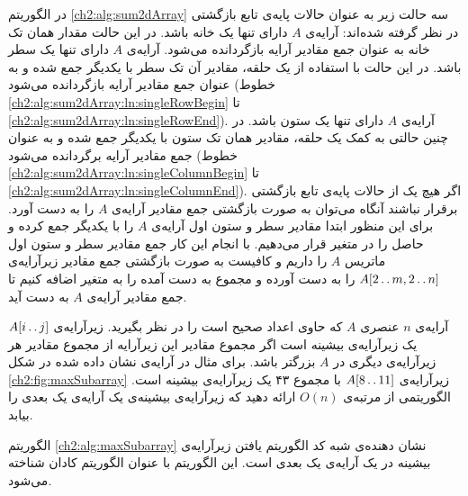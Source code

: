 در الگوریتم {\eqref{ch2:alg:sum2dArray}} سه حالت زیر به عنوان حالات پایه‌ی تابع بازگشتی در نظر گرفته شده‌اند:
 آرایه‌ی {$A$} دارای تنها یک خانه باشد. در این حالت مقدار همان تک خانه به عنوان جمع مقادیر آرایه بازگردانده می‌شود.
 آرایه‌ی {$A$} دارای تنها یک سطر باشد. در این حالت با استفاده از یک حلقه، مقادیر آن تک سطر با یکدیگر جمع شده و به عنوان جمع مقادیر آرایه بازگردانده می‌شود (خطوط {\ref{ch2:alg:sum2dArray:ln:singleRowBegin}} تا {\ref{ch2:alg:sum2dArray:ln:singleRowEnd}}).
 آرایه‌ی {$A$} دارای تنها یک ستون باشد. در چنین حالتی به کمک یک حلقه، مقادیر همان تک ستون با یکدیگر جمع شده و به عنوان جمع مقادیر آرایه برگردانده می‌شود (خطوط {\ref{ch2:alg:sum2dArray:ln:singleColumnBegin}} تا {\ref{ch2:alg:sum2dArray:ln:singleColumnEnd}}).
اگر هیچ یک از حالات پایه‌ی تابع بازگشتی برقرار نباشند آنگاه می‌توان به صورت بازگشتی جمع مقادیر آرایه‌ی {$A$} را به دست آورد. برای این منظور ابتدا مقادیر سطر و ستون اول آرایه‌ی {$A$} را با یکدیگر جمع کرده و حاصل را در متغیر {} قرار می‌دهیم. با انجام این کار جمع مقادیر سطر و ستون اول ماتریس {$A$} را داریم و کافیست به صورت بازگشتی جمع مقادیر زیرآرایه‌ی {$A[2\mathinner{\ldotp\ldotp} m,2\mathinner{\ldotp\ldotp} n]$} را به دست آورده و مجموع به دست آمده را به متغیر {} اضافه کنیم تا جمع مقادیر آرایه‌ی {$A$} به دست آید.

 آرایه‌ی‌ {$n$} عنصری {$A$} که حاوی اعداد صحیح است را در نظر بگیرید. زیرآرایه‌ی {$A[i\mathinner{\ldotp\ldotp} j]$} یک زیرآرایه‌ی بیشینه است اگر مجموع مقادیر این زیرآرایه از مجموع مقادیر هر زیرآرایه‌ی دیگری در {$A$} بزرگتر باشد. برای مثال در آرایه‌ی نشان داده شده در شکل {\eqref{ch2:fig:maxSubarray}} زیرآرایه‌ی {$A[8\mathinner{\ldotp\ldotp} 11]$} با مجموع ۴۳ یک زیرآرایه‌ی بیشینه است. الگوریتمی از مرتبه‌ی {$O(n)$} ارائه دهید که زیرآرایه‌ی بیشینه‌ی یک آرایه‌ی یک بعدی را بیابد.


الگوریتم {\eqref{ch2:alg:maxSubarray}} نشان دهنده‌‌ی شبه کد الگوریتم یافتن زیرآرایه‌ی بیشینه در یک آرایه‌ی یک بعدی است. این الگوریتم با عنوان الگوریتم کادان شناخته می‌شود.

